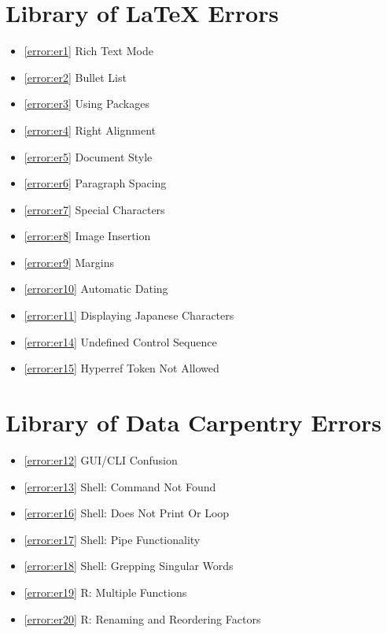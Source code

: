 \documentclass[12pt]{article}
\begin{document}

\newpage\section{Library of LaTeX Errors}
\begin{itemize}
\renewcommand{\labelitemi}{}
    \item \ref{error:er1} Rich Text Mode 
    \item \ref{error:er2} Bullet List 
    \item \ref{error:er3} Using Packages
    \item \ref{error:er4} Right Alignment
    \item \ref{error:er5} Document Style
    \item \ref{error:er6} Paragraph Spacing
    \item \ref{error:er7} Special Characters
    \item \ref{error:er8} Image Insertion
    \item \ref{error:er9} Margins
    \item \ref{error:er10} Automatic Dating
    \item \ref{error:er11} Displaying Japanese Characters
    \item \ref{error:er14} Undefined Control Sequence
    \item \ref{error:er15} Hyperref Token Not Allowed
\end{itemize}


\section{Library of Data Carpentry Errors}
\begin{itemize}
\renewcommand{\labelitemi}{}
    \item \ref{error:er12} GUI/CLI Confusion
    \item \ref{error:er13} Shell: Command Not Found
    \item \ref{error:er16} Shell: Does Not Print Or Loop
    \item \ref{error:er17} Shell: Pipe Functionality
    \item \ref{error:er18} Shell: Grepping Singular Words
    \item \ref{error:er19} R: Multiple Functions
    \item \ref{error:er20} R: Renaming and Reordering Factors
\end{itemize}
\end{document}
